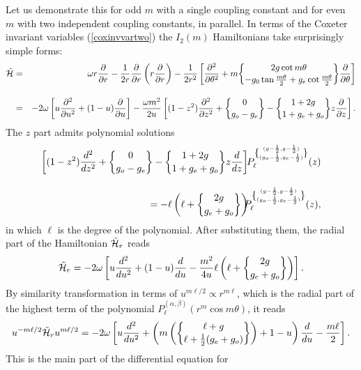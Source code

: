 \documentclass[a4paper,12pt]{article}
\begin{document}
Let us demonstrate this for odd \(m\) with a single coupling constant and
for
even \(m\) with two independent coupling constants, in parallel.
In terms of the Coxeter invariant variables (\ref{coxinvvartwo}) the
\(I_2(m)\) Hamiltonians take surprisingly simple forms:
\begin{eqnarray}
   \tilde{\cal H}&=&\omega r{\partial\over{\partial
   r}}-{1\over2r}{\partial\over{\partial r}}
   \left(r{\partial\over{\partial r}}\right)
   -{1\over2r^2}\left[{\partial^2\over{\partial \theta^2}}+m{2g\cot m\theta
   \brace
   -g_0\tan{m\theta\over2}+g_e\cot{m\theta\over2}}{\partial\over{\partial
   \theta}}\right]\\[10pt]
   &=&-2\omega\left[u{\partial^2\over{\partial u^2}}
  +(1-u){\partial\over{\partial
   u}}\right] -{\omega m^2\over{2u}}
   \left[(1-z^2){\partial^2\over{\partial z^2}}+
   {0\brace g_o-g_e} -{1+2g\brace 1+g_e+g_o}z{\partial\over{\partial
   z}}\right].\nonumber
\end{eqnarray}
The \(z\) part admits polynomial solutions
\begin{eqnarray}
   \left[(1-z^2){d^2\over{dz^2}}+
   {0\brace g_o-g_e}
   -{1+2g\brace
   1+g_e+g_o}z{d\over{dz}}\right]&&\hspace{-.5cm}
   P_{\ell}^{{(g-{1\over2},g-{1\over2})
  \brace(g_o-{1\over2},
   g_e-{1\over2})}}(z)
   \nonumber\\[10pt]
   =-\ell\left(\ell+{2g\brace g_e+g_o}\right)
   &&\hspace{-.5cm}
   P_{\ell}^{{(g-{1\over2},g-{1\over2})
   \brace(g_o-{1\over2},g_e-{1\over2})}}(z),
\end{eqnarray}
in which \(\ell\) is the degree of the polynomial.
After substituting them, the radial part of the Hamiltonian
\(\tilde{\cal H}_r\)
reads
\begin{equation}
   \tilde{\cal H}_r=-2\omega\left[u{d^2\over{du^2}}
   +(1-u){d\over{du}}
-{m^2\over{4u}}\ell\left(\ell+{2g\brace g_e+g_o}\right)\right].
\end{equation}
By similarity transformation in terms of \(u^{m\ell/2}\propto r^{m\ell}\),
which is
the radial part of the highest term of the
polynomial \(P^{(\alpha,\beta)}_{\ell}(r^m\cos m\theta)\), it reads
\begin{equation}
   u^{-m\ell/2}\tilde{\cal H}_ru^{m\ell/2}=
   -2\omega\left[u{d^2\over{du^2}}+\left(m\left({\ell +g\brace
   \ell+{1\over2}(g_e+g_o)}\right)+1-u\right)
   {d\over{du}}-{m\ell\over2}\right].
\end{equation}
This is the main part of the differential equation for
\end{document}
